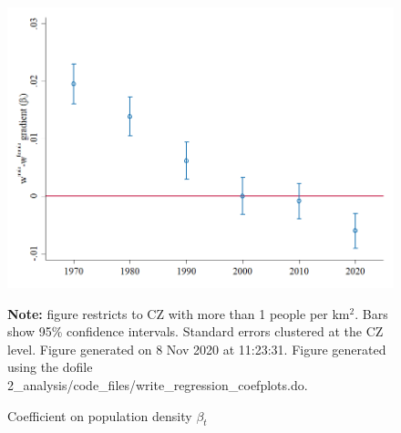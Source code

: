 \begin{figure}[!h]
\centering
\caption{Coefficient on population density $ \beta_t $}
\includegraphics[width=1\textwidth]{../2_analysis/output/figures/baseline_l_czone_pop_full_time}
\par \begin{minipage}[h]{\textwidth}{\tiny\textbf{Note:} figure restricts to CZ with more than 1 people per km$^2$. Bars show 95\% confidence intervals. Standard errors clustered at the CZ level. Figure generated on  8 Nov 2020 at 11:23:31. Figure generated using the dofile 2\_analysis/code\_files/write\_regression\_coefplots.do.}\end{minipage}
\end{figure}
